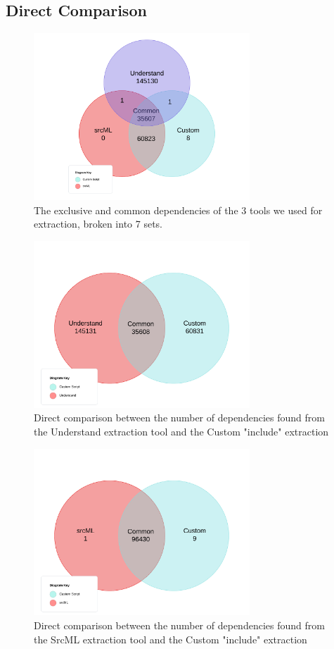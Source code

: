\documentclass[12pt, dvipsnames, a4paper]{article}
\begin{document}
\subsection{Direct Comparison}

\begin{figure}[H]
	\center
	\includegraphics[width = 230pt]{assets/UnderstandCustom.png}
	\caption{The exclusive and common dependencies of the 3 tools we used for extraction, broken into 7 sets.}
\end{figure}

\begin{figure}[H]
	\center
	\includegraphics[width = 230pt]{assets/UnderstandCustom.jpeg}
	\caption{Direct comparison between the number of dependencies found from the Understand extraction tool and the Custom "include" extraction}
\end{figure}

\begin{figure}[H]
	\center
	\includegraphics[width = 230pt]{assets/SrcMLCustom.jpeg}
	\caption{Direct comparison between the number of dependencies found from the SrcML extraction tool and the Custom "include" extraction}
\end{figure}
\end{document}
